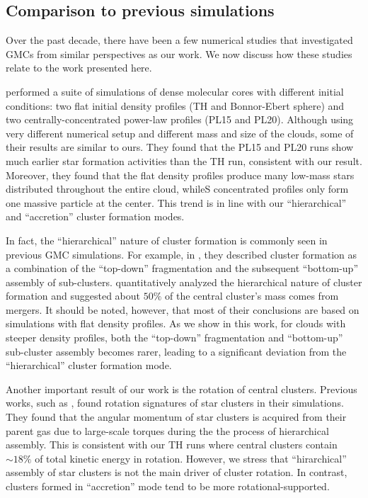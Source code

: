 \documentclass[fleqn,usenatbib]{mnras}
\begin{document}
\subsection{Comparison to previous simulations}
\label{sec:comparison}

Over the past decade, there have been a few numerical studies that investigated GMCs from similar perspectives as our work. We now discuss how these studies relate to the work presented here.

\citet{girichidis_importance_2011, girichidis_importance_2012, girichidis_importance_2012-1} performed a suite of simulations of dense molecular cores with different initial conditions: two flat initial density profiles (TH and Bonnor-Ebert sphere) and two centrally-concentrated power-law profiles (PL15 and PL20).
Although using very different numerical setup and different mass and size of the clouds, some of their results are similar to ours.
They found that the PL15 and PL20 runs show much earlier star formation activities than the TH run, consistent with our result. Moreover, they found that the flat density profiles produce many low-mass stars distributed throughout the entire cloud, whileS concentrated profiles only form one massive particle at the center. This trend is in line with our ``hierarchical'' and ``accretion'' cluster formation modes.

In fact, the ``hierarchical'' nature of cluster formation is commonly seen in previous GMC simulations. For example, in \citet{grudic_top_2018}, they described cluster formation as a combination of the ``top-down'' fragmentation and the subsequent ``bottom-up'' assembly of sub-clusters. \citet{howard_universal_2018} quantitatively analyzed the hierarchical nature of cluster formation and suggested about $50\%$ of the central cluster's mass comes from mergers. It should be noted, however, that most of their conclusions are based on simulations with flat density profiles. As we show in this work, for clouds with steeper density profiles, both the ``top-down'' fragmentation and ``bottom-up'' sub-cluster assembly becomes rarer, leading to a significant deviation from the ``hierarchical'' cluster formation mode.

Another important result of our work is the rotation of central clusters. Previous works, such as \citet[][]{mapelli_rotation_2017, ballone_evolution_2020}, found rotation signatures of star clusters in their simulations. They found that the angular momentum of star clusters is acquired from their parent gas due to large-scale torques during the the process of hierarchical assembly. This is consistent with our TH runs where central clusters contain $\sim18\%$ of total kinetic energy in rotation. However, we stress that ``hirarchical'' assembly of star clusters is not the main driver of cluster rotation. In contrast, clusters formed in ``accretion'' mode tend to be more rotational-supported.
\end{document}
